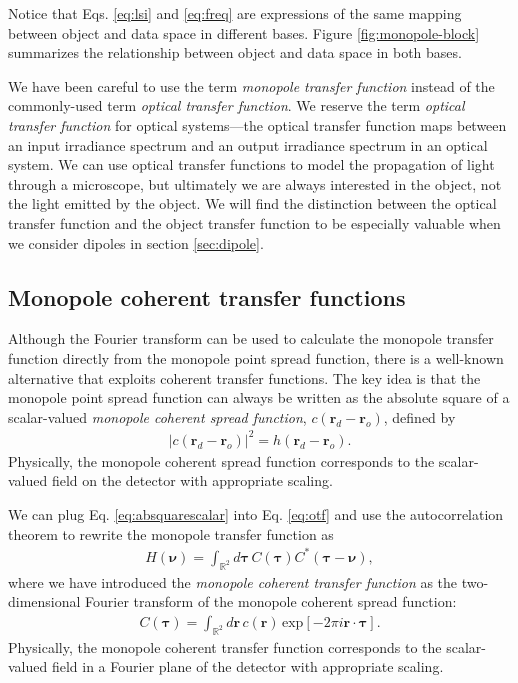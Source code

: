 \documentclass[]{osa-article}
\providecommand{\mb}[1]{\mathbf{#1}}
\providecommand{\ro}{\mathbf{\mathbf{r}}_o}
\providecommand{\rd}{\mathbf{r}_d}
\providecommand{\mbb}[1]{\mathbb{#1}}
\providecommand{\bs}[1]{\boldsymbol{#1}}
\providecommand{\bv}{\bs{\nu}}
\providecommand{\taup}{\bs{\tau}}
\begin{document}
Notice that Eqs. \eqref{eq:lsi} and \eqref{eq:freq} are expressions of the same
mapping between object and data space in different bases. Figure
\ref{fig:monopole-block} summarizes the relationship between object and data
space in both bases.

We have been careful to use the term \textit{monopole transfer function} instead
of the commonly-used term \textit{optical transfer function}. We reserve the
term \textit{optical transfer function} for optical systems---the optical
transfer function maps between an input irradiance spectrum and an output
irradiance spectrum in an optical system. We can use optical transfer functions
to model the propagation of light through a microscope, but ultimately we are
always interested in the object, not the light emitted by the object. We will
find the distinction between the optical transfer function and the object
transfer function to be especially valuable when we consider dipoles in section \ref{sec:dipole}.

\subsection{Monopole coherent transfer functions}
Although the Fourier transform can be used to calculate the monopole transfer
function directly from the monopole point spread function, there is a well-known
alternative that exploits coherent transfer functions. The key idea is that the
monopole point spread function can always be written as the absolute square of a
scalar-valued \textit{monopole coherent spread function}, $c(\rd - \ro)$,
defined by
\begin{align}
  |c(\rd - \ro)|^2 = h(\rd - \ro). \label{eq:absquarescalar}
\end{align}
Physically, the monopole coherent spread function corresponds to the
scalar-valued field on the detector with appropriate scaling.

We can plug Eq. \eqref{eq:absquarescalar} into Eq. \eqref{eq:otf} and use the
autocorrelation theorem to rewrite the monopole transfer function as
\begin{align}
  H(\bv) = \int_{\mbb{R}^2}d\taup\, C(\taup)C^*(\taup - \bv), 
\end{align}
where we have introduced the
\textit{monopole coherent transfer function} as the two-dimensional Fourier
transform of the monopole coherent spread function:
\begin{align}
  C(\taup) = \int_{\mbb{R}^2}d\mb{r}\, c(\mb{r})\,\text{exp}[-2\pi i\mb{r}\cdot\taup].
\end{align}
Physically, the monopole coherent transfer function corresponds to the
scalar-valued field in a Fourier plane of the detector with appropriate scaling.
\end{document}
